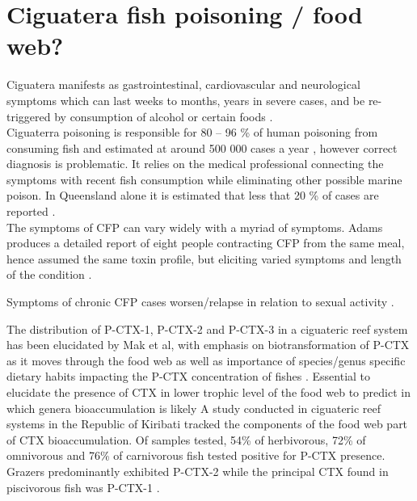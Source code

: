 \section{Ciguatera fish poisoning /  food web?}

Ciguatera manifests as gastrointestinal, cardiovascular and neurological symptoms which can last weeks to months, years in severe cases, and be re-triggered by consumption of alcohol or certain foods \cite{lewis2006ciguatera}. 
\\

Ciguaterra poisoning is responsible for 80 – 96 \% of human poisoning from consuming fish and estimated at around 500 000 cases a year \cite{grandjean2008centers}, however correct diagnosis is problematic. It relies on the medical professional connecting the symptoms with recent fish consumption while eliminating other possible marine poison. In Queensland alone it is estimated that less that 20 \% of cases are reported \cite{lewis2006ciguatera}.\\

The symptoms of CFP can vary widely with a myriad of symptoms. Adams produces a detailed report of eight people contracting CFP from the same meal, hence assumed the same toxin profile, but eliciting varied symptoms and length of the condition \cite{adams1993outbreak}.

Symptoms of chronic CFP cases worsen/relapse in relation to sexual activity \cite{lange1992travel}.

The distribution of P-CTX-1, P-CTX-2 and P-CTX-3 in a ciguateric reef system has been elucidated by Mak et al, with emphasis on biotransformation of P-CTX as it moves through the food web as well as importance of species/genus specific dietary habits impacting the P-CTX concentration of fishes \cite{mak2013pacific}.
Essential to elucidate the presence of CTX in lower trophic level of the food web to predict in which genera bioaccumulation is likely \cite{mak2013pacific}
A study conducted in ciguateric reef systems in the Republic of Kiribati tracked the components of the food web part of CTX bioaccumulation. Of samples tested, 54\% of herbivorous, 72\% of omnivorous and 76\% of carnivorous fish tested positive for P-CTX presence. Grazers predominantly exhibited P-CTX-2 while the principal CTX found in piscivorous fish was P-CTX-1 \cite{mak2013pacific}.

